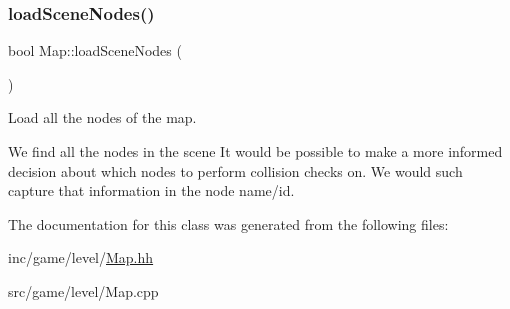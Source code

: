 \subsubsection{\texorpdfstring{load\+Scene\+Nodes()}{loadSceneNodes()}}
{\footnotesize\ttfamily bool Map\+::load\+Scene\+Nodes (\begin{DoxyParamCaption}{ }\end{DoxyParamCaption})}



Load all the nodes of the map. 

We find all the nodes in the scene It would be possible to make a more informed decision about which nodes to perform collision checks on. We would such capture that information in the node name/id. 

The documentation for this class was generated from the following files\+:\begin{DoxyCompactItemize}
\item 
inc/game/level/\hyperlink{Map_8hh}{Map.\+hh}\item 
src/game/level/Map.\+cpp\end{DoxyCompactItemize}
